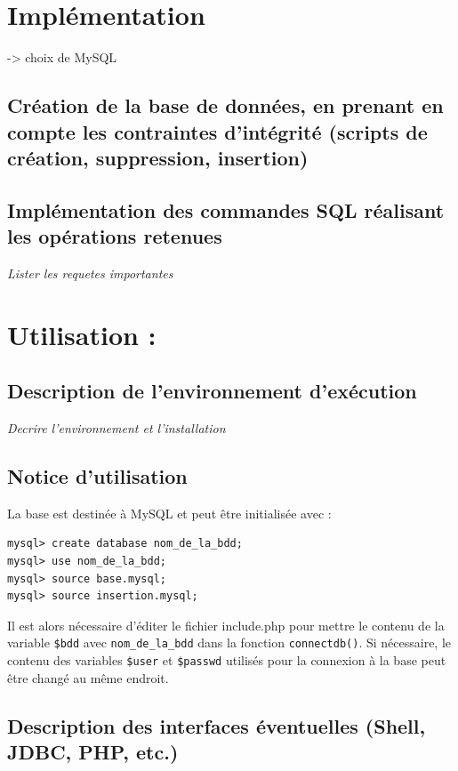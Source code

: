 \documentclass[12pt]{report}
\begin{document}
\section{Implémentation }
-> choix de MySQL

\subsection{Création de la base de données, en prenant en compte les contraintes d'intégrité (scripts de création, suppression, insertion)}

\subsection{Implémentation des commandes SQL réalisant les opérations retenues}

\emph{Lister les requetes importantes}

\section{Utilisation :}

\subsection{Description de l'environnement d'exécution}

\emph{Decrire l'environnement et l'installation}

\subsection{Notice d'utilisation}

La base est destinée à MySQL et peut être initialisée avec :
\begin{verbatim}
mysql> create database nom_de_la_bdd;
mysql> use nom_de_la_bdd;
mysql> source base.mysql;
mysql> source insertion.mysql;
\end{verbatim}

Il est alors nécessaire d'éditer le fichier include.php pour mettre le contenu
de la variable \verb!$bdd! avec \verb!nom_de_la_bdd! dans la fonction
\verb!connectdb()!. Si nécessaire, le contenu des variables \verb!$user! et
\verb!$passwd! utilisés pour la connexion à la base peut être changé au même
endroit.

\subsection{Description des interfaces éventuelles (Shell, JDBC, PHP, etc.)}
\end{document}
